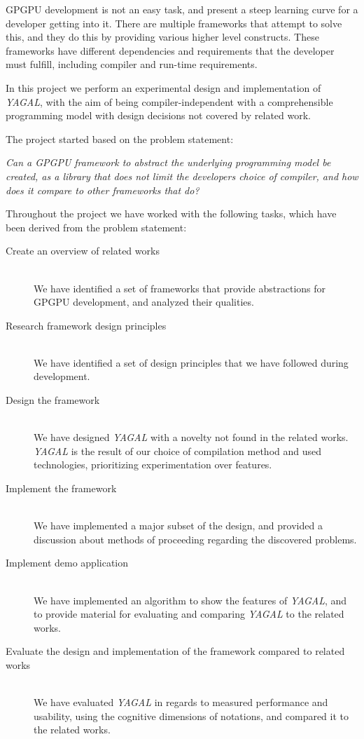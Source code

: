 GPGPU development is not an easy task, and present a steep learning curve for a developer getting into it. There are multiple frameworks that attempt to solve this, and they do this by providing various higher level constructs. These frameworks have different dependencies and requirements that the developer must fulfill, including compiler and run-time requirements. 

In this project we perform an experimental design and implementation of \textit{YAGAL}, with the aim of being compiler-independent with a comprehensible programming model with design decisions not covered by related work.

The project started based on the problem statement:

\textit{Can a GPGPU framework to abstract the underlying programming model be created, as a library that does not limit the developers choice of compiler, and how does it compare to other frameworks that do?}

Throughout the project we have worked with the following tasks, which have been derived from the problem statement:

\begin{description}
\item[Create an overview of related works]\hfill \\
We have identified a set of frameworks that provide abstractions for GPGPU development, and analyzed their qualities.
\item[Research framework design principles]\hfill \\
We have identified a set of design principles that we have followed during development.
\item[Design the framework]\hfill \\
We have designed \textit{YAGAL} with a novelty not found in the related works. \textit{YAGAL} is the result of our choice of compilation method and used technologies, prioritizing experimentation over features.
\item[Implement the framework]\hfill \\
We have implemented a major subset of the design, and provided a discussion about methods of proceeding regarding the discovered problems. 
\item[Implement demo application]\hfill \\
We have implemented an algorithm to show the features of \textit{YAGAL}, and to provide material for evaluating and comparing \textit{YAGAL} to the related works.
\item[Evaluate the design and implementation of the framework compared to related works]\hfill \\
We have evaluated \textit{YAGAL} in regards to measured performance and usability, using the cognitive dimensions of notations, and compared it to the related works.
\end{description}


